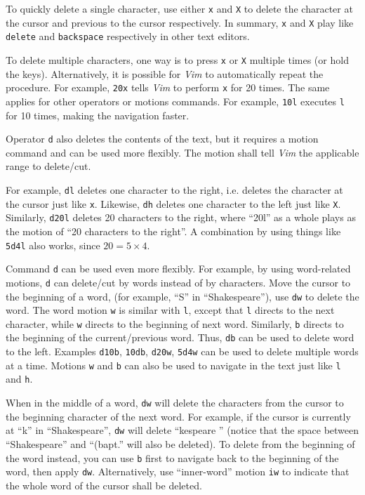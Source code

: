 To quickly delete a single character, use either \verb|x| and \verb|X| to delete the character at the cursor and previous to the cursor respectively. In summary, \verb|x| and \verb|X| play like \verb|delete| and \verb|backspace| respectively in other text editors.

To delete multiple characters, one way is to press \verb|x| or \verb|X| multiple times (or hold the keys). Alternatively, it is possible for \textit{Vim} to automatically repeat the procedure. For example, \verb|20x| tells \textit{Vim} to perform \verb|x| for 20 times. The same applies for other operators or motions commands. For example, \verb|10l| executes \verb|l| for 10 times, making the navigation faster.

Operator \verb|d| also deletes the contents of the text, but it requires a motion command and can be used more flexibly. The motion shall tell \textit{Vim} the applicable range to delete/cut.

For example, \verb|dl| deletes one character to the right, i.e. deletes the character at the cursor just like \verb|x|. Likewise, \verb|dh| deletes one character to the left just like \verb|X|. Similarly, \verb|d20l| deletes 20 characters to the right, where ``20l'' as a whole plays as the motion of ``20 characters to the right''. A combination by using things like \verb|5d4l| also works, since $20=5\times 4$.

Command \verb|d| can be used even more flexibly. For example, by using word-related motions, \verb|d| can delete/cut by words instead of by characters. Move the cursor to the beginning of a word, (for example, ``S'' in ``Shakespeare''), use \verb|dw| to delete the word. The word motion \verb|w| is similar with \verb|l|, except that \verb|l| directs to the next character, while \verb|w| directs to the beginning of next word. Similarly, \verb|b| directs to the beginning of the current/previous word. Thus, \verb|db| can be used to delete word to the left. Examples \verb|d10b|, \verb|10db|, \verb|d20w|, \verb|5d4w| can be used to delete multiple words at a time. Motions \verb|w| and \verb|b| can also be used to navigate in the text just like \verb|l| and \verb|h|.

When in the middle of a word, \verb|dw| will delete the characters from the cursor to the beginning character of the next word. For example, if the cursor is currently at ``k'' in ``Shakespeare'', \verb|dw| will delete ``kespeare '' (notice that the space between ``Shakespeare'' and ``(bapt.'' will also be deleted). To delete from the beginning of the word instead, you can use \verb|b| first to navigate back to the beginning of the word, then apply \verb|dw|. Alternatively, use ``inner-word'' motion \verb|iw| to indicate that the whole word of the cursor shall be deleted.

